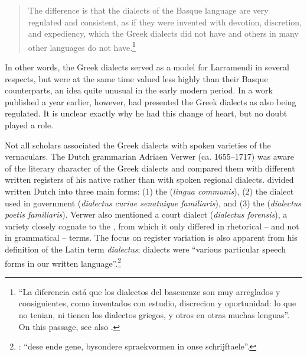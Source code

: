 \begin{quote}
The difference is that the dialects of the Basque language are very regulated and consistent, as if they were invented with devotion, discretion, and expediency, which the Greek dialects did not have and others in many other languages do not have.\footnote{“La diferencia está que los dialectos del bascuenze son muy arreglados y consiguientes, como inventados con estudio, discrecion y oportunidad: lo que no tenian, ni tienen los dialectos griegos, y otros en otras muchas lenguas”. On this passage, see also \citet[876]{Hasler2009}.}
\end{quote}

In other words, the Greek dialects served as a model for Larramendi in several respects, but were at the same time valued less highly than their Basque counterparts, an idea quite unusual in the early modern period. In a work published a year earlier, however, \citet[142]{Larramendi1728} had presented the Greek dialects as also being regulated. It is unclear exactly why he had this change of heart, but  no doubt played a role.

Not all scholars associated the Greek dialects with spoken varieties of the vernaculars. The Dutch grammarian Adriaen Verwer (ca. 1655–1717) was aware of the literary character of the Greek dialects and compared them with different written registers of his native  rather than with spoken regional dialects. \citet[53--54]{Verwer1707} divided written Dutch into three main forms: (1) the  (\textit{lingua communis}), (2) the dialect used in government (\textit{dialectus curiae senatuique familiaris}), and (3) the  (\textit{dialectus poetis familiaris}). Verwer also mentioned a court dialect (\textit{dialectus forensis}), a variety closely cognate to the , from which it only differed in rhetorical – and not in grammatical – terms. The focus on register variation is also apparent from his definition of the Latin term \textit{dialectus}; dialects were “various particular speech forms in our written language”.\footnote{\citet[53]{Verwer1707}: “dese ende gene, bysondere spraekvormen in onse schrijftaele”.}

